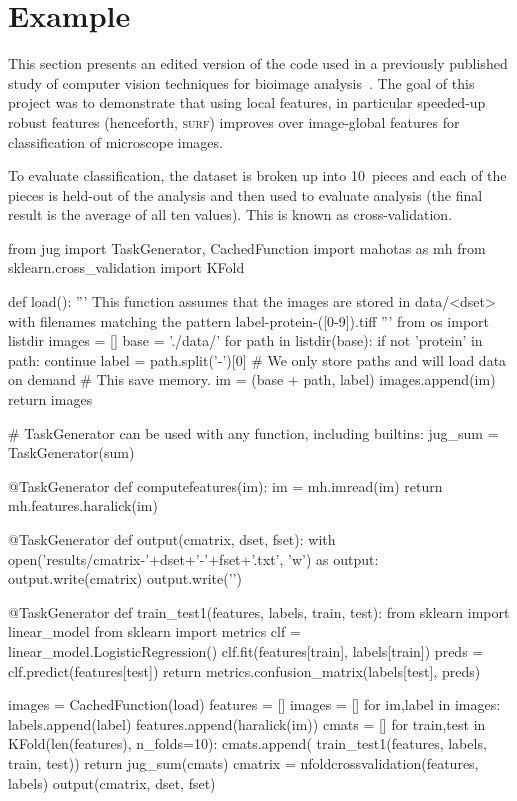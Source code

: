\documentclass{article}
\begin{document}
\section{Example}
This section presents an edited version of the code used in a previously
published study of computer vision techniques for bioimage
analysis~\cite{coelho2013determining}. The goal of this project was to
demonstrate that using local features, in particular speeded-up robust features
(henceforth, \textsc{surf}) improves over image-global features for
classification of microscope images.

To evaluate classification, the dataset is broken up into 10~pieces and each of
the pieces is held-out of the analysis and then used to evaluate analysis (the
final result is the average of all ten values). This is known as
cross-validation.

\begin{python}
from jug import TaskGenerator, CachedFunction
import mahotas as mh
from sklearn.cross_validation import KFold

def load():
    '''
    This function assumes that the images are stored in
    data/<dset> with filenames matching the pattern
    label-protein-([0-9]).tiff
    '''
    from os import listdir
    images = []
    base = './data/'
    for path in listdir(base):
        if not 'protein' in path: continue
        label = path.split('-')[0]
        # We only store paths and will load data on demand
        # This save memory.
        im = (base + path, label)
        images.append(im)
    return images


# TaskGenerator can be used with any function, including builtins:
jug_sum = TaskGenerator(sum)

@TaskGenerator
def computefeatures(im):
    im = mh.imread(im)
    return mh.features.haralick(im)

@TaskGenerator
def output(cmatrix, dset, fset):
    with open('results/cmatrix-'+dset+'-'+fset+'.txt', 'w') as output:
        output.write(cmatrix)
        output.write('\n')

@TaskGenerator
def train_test1(features, labels, train, test):
    from sklearn import linear_model
    from sklearn import metrics
    clf = linear_model.LogisticRegression()
    clf.fit(features[train], labels[train])
    preds = clf.predict(features[test])
    return metrics.confusion_matrix(labels[test], preds)


images = CachedFunction(load)
features = []
images = []
for im,label in images:
    labels.append(label)
    features.append(haralick(im))
cmats = []
for train,test in KFold(len(features), n_folds=10):
    cmats.append(
        train_test1(features, labels, train, test))
return jug_sum(cmats)
cmatrix = nfoldcrossvalidation(features, labels)
output(cmatrix, dset, fset)
\end{python}
\end{document}
